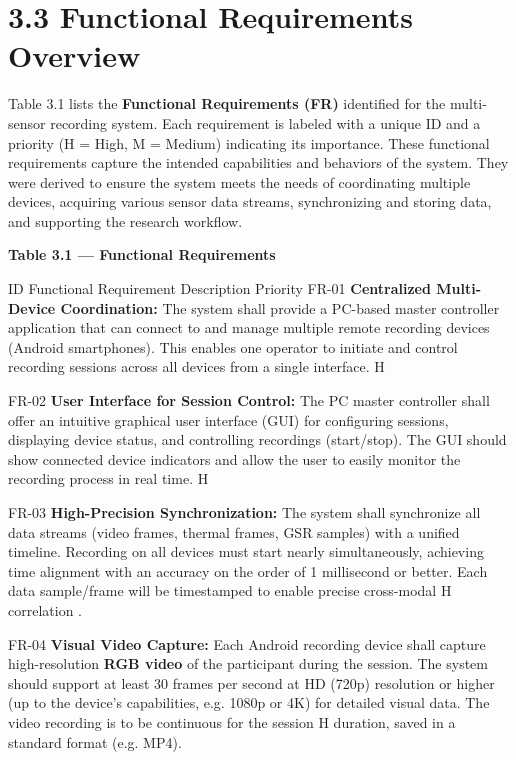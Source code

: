 \documentclass[11pt,a4paper]{report}
\begin{document}
\section{3.3 Functional Requirements Overview}

Table 3.1 lists the \textbf{Functional Requirements (FR)} identified for the
multi-sensor recording system. Each requirement is labeled with a unique
ID and a priority (H = High, M = Medium) indicating its importance.
These functional requirements capture the intended capabilities and
behaviors of the system. They were derived to ensure the system meets
the needs of coordinating multiple devices, acquiring various sensor
data streams, synchronizing and storing data, and supporting the
research workflow.

\textbf{Table 3.1 --- Functional Requirements}

  ID Functional Requirement Description Priority
  FR-01 \textbf{Centralized Multi-Device Coordination:} The system shall provide a
  PC-based master controller application that can connect to and manage multiple
  remote recording devices (Android smartphones).  This enables one operator to
  initiate and control recording sessions across all devices from a single interface.
  H

  FR-02 \textbf{User Interface for Session Control:} The PC master controller shall
  offer an intuitive graphical user interface (GUI) for configuring sessions,
  displaying device status, and controlling recordings (start/stop).  The GUI should
  show connected device indicators and allow the user to easily monitor the recording
  process in real time.  H

  FR-03 \textbf{High-Precision Synchronization:} The system shall synchronize all
  data streams (video frames, thermal frames, GSR samples) with a unified timeline.
  Recording on all devices must start nearly simultaneously, achieving time alignment
  with an accuracy on the order of 1 millisecond or better.  Each data sample/frame
  will be timestamped to enable precise cross-modal H
                          correlation \cite{Boucsein2012}.

  FR-04 \textbf{Visual Video Capture:} Each Android recording device shall capture
  high-resolution \textbf{RGB video} of the participant during the session.  The
  system should support at least 30 frames per second at HD (720p) resolution or
  higher (up to the device's capabilities, e.g.  1080p or 4K) for detailed visual
  data.  The video recording is to be continuous for the session H
                          duration, saved in a standard format (e.g. MP4).
\end{document}
